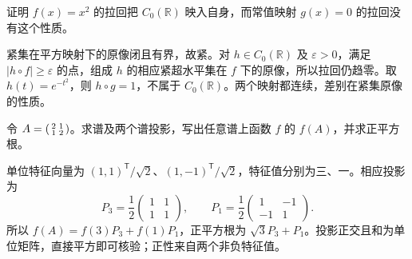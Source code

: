 \begin{exercise}\label{b2:ex:D-czero-pullback}
	证明 \(f(x)=x^2\) 的拉回把 \(C_0(\mathbb R)\) 映入自身，而常值映射 \(g(x)=0\) 的拉回没有这个性质。
\end{exercise}
\begin{solution}
	紧集在平方映射下的原像闭且有界，故紧。对 \(h\in C_0(\mathbb R)\) 及 \(\varepsilon>0\)，满足 \(|h\circ f|\ge\varepsilon\) 的点，组成 \(h\) 的相应紧超水平集在 \(f\) 下的原像，所以拉回仍趋零。取 \(h(t)=e^{-t^2}\)，则 \(h\circ g=1\)，不属于 \(C_0(\mathbb R)\)。两个映射都连续，差别在紧集原像的性质。
\end{solution}

\begin{exercise}\label{b2:ex:D-functional-calculus-matrix}
	令 \(A=\begin{psmallmatrix}2&1\\1&2\end{psmallmatrix}\)。求谱及两个谱投影，写出任意谱上函数 \(f\) 的 \(f(A)\)，并求正平方根。
\end{exercise}
\begin{solution}
	单位特征向量为 \((1,1)^{\mathsf T}/\sqrt2\)、\((1,-1)^{\mathsf T}/\sqrt2\)，特征值分别为三、一。相应投影为
	\[
		P_3=\frac12\begin{pmatrix}1&1\\1&1\end{pmatrix},\qquad
		P_1=\frac12\begin{pmatrix}1&-1\\-1&1\end{pmatrix}.
	\]
	所以 \(f(A)=f(3)P_3+f(1)P_1\)，正平方根为 \(\sqrt3P_3+P_1\)。投影正交且和为单位矩阵，直接平方即可核验；正性来自两个非负特征值。
\end{solution}

